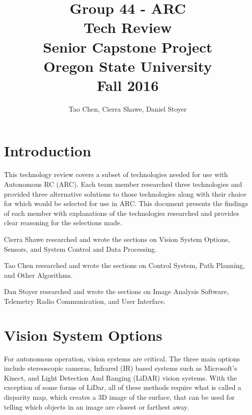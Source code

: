 \documentclass[compsoc,draftclsnofoot,onecolumn,10pt]{IEEEtran}
\begin{document}
\begin{titlepage}
\title{
Group 44 - ARC \\
Tech Review\\
\LARGE
Senior Capstone Project\\
Oregon State University\\
Fall 2016
}

\author{Tao Chen, Cierra Shawe, Daniel Stoyer}
\maketitle

\begin{abstract}

\end{abstract}

\thispagestyle{empty} %

\end{titlepage}
\newpage

\tableofcontents

\newpage

\section{Introduction}
This technology review covers a subset of technologies needed for use with
Autonomous RC (ARC). Each team member researched three technologies and provided
three alternative solutions to those technologies along with their choice for
which would be selected for use in ARC. This document presents the
findings of each member with explanations of the technologies researched and
provides clear reasoning for the selections made.\par
Cierra Shawe researched and wrote the sections on Vision System Options,
Sensors, and System Control and Data Processing.\par
Tao Chen researched and wrote the sections on Control System, Path Planning, and
Other Algorithms.\par
Dan Stoyer researched and wrote the sections on Image Analysis Software,
Telemetry Radio Communication, and User Interface.\par


\section{Vision System Options} %
For autonomous operation, vision systems are critical. 
The three main options include stereoscopic cameras, Infrared (IR) based systems such as Microsoft's Kinect, and Light Detection And Ranging (LiDAR) vision systems. 
With the exception of some forms of LiDar, all of these methods require what is called a disparity map, which creates a 3D image of the surface, that can be used for telling which objects in an image are closest or farthest away. 
\end{document}
